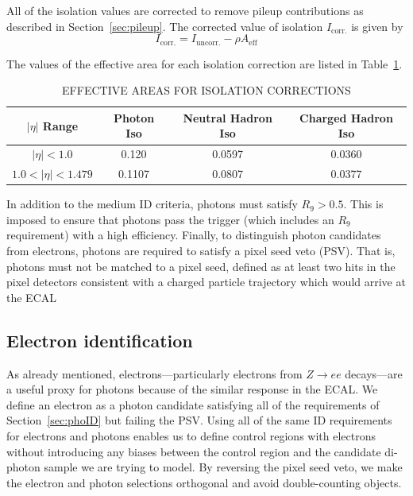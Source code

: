 All of the isolation values are corrected to remove pileup contributions as described in Section~\ref{sec:pileup}. The corrected value of isolation $I_{\mathrm{corr.}}$ is given by 
\begin{equation}
I_{\mathrm{corr.}} = I_{\mathrm{uncorr.}} - \rho A_{\mathrm{eff}}
\end{equation}

The values of the effective area for each isolation correction are listed in Table~\ref{tab:EA}.

\begin{table}[ht]
    \caption{EFFECTIVE AREAS FOR ISOLATION CORRECTIONS}
    \centering
    \begin{tabular}{ | c | c | c | c |}
        \hline
        	\hline
        \textbf{$|\eta|$ Range} & \textbf{Photon Iso} & \textbf{Neutral Hadron Iso} & \textbf{Charged Hadron Iso} \\ [0.5ex]
        \hline
        	$|\eta| < 1.0 $                 & 0.120   &  0.0597 & 0.0360\\
	$ 1.0 < |\eta| < 1.479 $   & 0.1107 & 0.0807 & 0.0377 \\
		 \hline
           \hline
    \end{tabular}
    \label{tab:EA}
\end{table}


In addition to the medium ID criteria, photons must satisfy $R_9 > 0.5$. This is imposed to ensure that photons pass the trigger (which includes an $R_9$ requirement) with a high efficiency. Finally, to distinguish photon candidates from electrons, photons are required to satisfy a pixel seed veto (PSV). That is, photons must not be matched to a pixel seed, defined as at least two hits in the pixel detectors consistent with a charged particle trajectory which would arrive at the ECAL 

\subsection{Electron identification}
\label{sec:eleID}
As already mentioned, electrons---particularly electrons from $Z\rightarrow ee$ decays---are a useful proxy for photons because of the similar response in the ECAL. We define an electron as a photon candidate satisfying all of the requirements of Section~\ref{sec:phoID} but failing the PSV. Using all of the same ID requirements for electrons and photons enables us to define control regions with electrons without introducing any biases between the control region and the candidate di-photon sample we are trying to model. By reversing the pixel seed veto, we make the electron and photon selections orthogonal and avoid double-counting objects.

